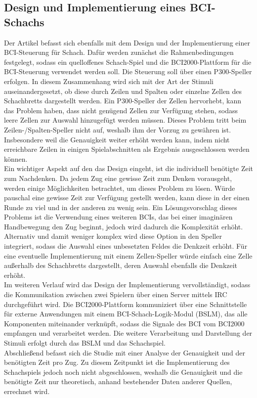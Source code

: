 \subsection{Design und Implementierung eines BCI-Schachs}
\label{chessDesignAndImplemention}
Der Artikel \cite{toersche2007designing} befasst sich ebenfalls mit dem Design und der Implementierung einer BCI-Steuerung für Schach.
Dafür werden zunächst die Rahmenbedingungen festgelegt, sodass ein quelloffenes Schach-Spiel und die \acs{BCI2000}-Plattform für die BCI-Steuerung verwendet werden soll.
Die Steuerung soll über einen P300-Speller erfolgen.
In diesem Zusammenhang wird sich mit der Art der Stimuli auseinandergesetzt, ob diese durch Zeilen und Spalten oder einzelne Zellen des Schachbretts dargestellt werden.
Ein P300-Speller der Zellen hervorhebt, kann das Problem haben, dass nicht genügend Zellen zur Verfügung stehen, sodass leere Zellen zur Auswahl hinzugefügt werden müssen.
Dieses Problem tritt beim Zeilen-/Spalten-Speller nicht auf, weshalb ihm der Vorzug zu gewähren ist.
Insbesondere weil die Genauigkeit weiter erhöht werden kann, 
indem nicht erreichbare Zeilen in einigen Spielabschnitten als Ergebnis ausgeschlossen werden können.\\
Ein wichtiger Aspekt auf den das Design eingeht, ist die individuell benötigte Zeit zum Nachdenken.
Da jedem Zug eine gewisse Zeit zum Denken vorausgeht, werden einige Möglichkeiten betrachtet, um dieses Problem zu lösen.
Würde pauschal eine gewisse Zeit zur Verfügung gestellt werden, kann diese in der einen Runde zu viel und in der anderen zu wenig sein.
Ein Lösungsvorschlag dieses Problems ist die Verwendung eines weiteren BCIs, das bei einer imaginären Handbewegung den Zug beginnt, jedoch wird dadurch die Komplexität erhöht.
Alternativ und damit weniger komplex wird diese Option in den Speller integriert, sodass die Auswahl eines unbesetzten Feldes die Denkzeit erhöht.
Für eine eventuelle Implementierung mit einem Zellen-Speller würde einfach eine Zelle außerhalb des Schachbretts dargestellt, deren Auswahl ebenfalls die Denkzeit erhöht.\\
Im weiteren Verlauf wird das Design der Implementierung vervollständigt, sodass die Kommunikation zwischen zwei Spielern über einen Server mittels IRC durchgeführt wird.
Die BCI2000-Plattform kommuniziert über eine Schnittstelle für externe Anwendungen mit einem BCI-Schach-Logik-Modul (BSLM), 
das alle Komponenten miteinander verknüpft, sodass die Signale des BCI vom BCI2000 empfangen und verarbeitet werden.
Die weitere Verarbeitung und Darstellung der Stimuli erfolgt durch das BSLM und das Schachspiel.\\
Abschließend befasst sich die Studie mit einer Analyse der Genauigkeit und der benötigten Zeit pro Zug.
Zu diesem Zeitpunkt ist die Implementierung des Schachspiels jedoch noch nicht abgeschlossen, weshalb die Genauigkeit und die benötigte Zeit nur theoretisch, anhand bestehender Daten anderer Quellen, errechnet wird.\\








